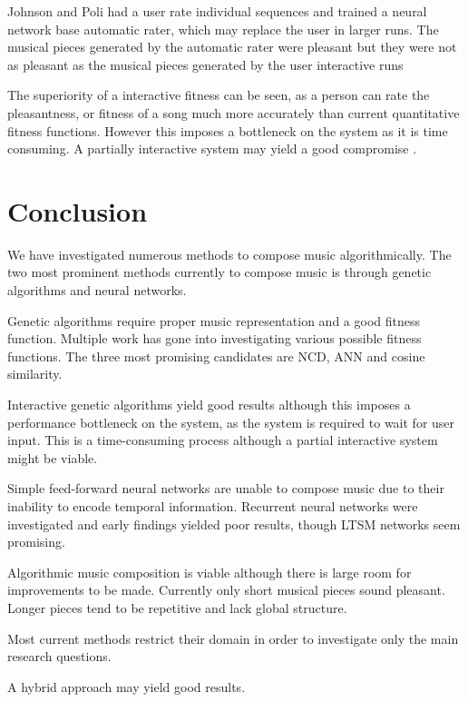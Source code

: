 Johnson and Poli had a user rate individual sequences and trained a neural network base automatic rater, which may replace the user in larger runs. The musical pieces generated by the automatic rater were pleasant but they were not as pleasant as the musical pieces generated by the user interactive runs \cite{Johanson1998}

The superiority of a interactive fitness can be seen, as a person can rate the pleasantness, or fitness of a song much more accurately than current quantitative fitness functions. However this imposes a bottleneck on the system as it is time consuming. A partially interactive system may yield a good compromise \cite{Biles1996}.


\chapter{Conclusion}
We have investigated numerous methods to compose music algorithmically. The two most prominent methods currently to compose music is through genetic algorithms and neural networks.

Genetic algorithms require proper music representation and a good fitness function. Multiple work has gone into investigating various possible fitness functions. The three most promising candidates are \ac{NCD}, \ac{ANN} and cosine similarity.

Interactive genetic algorithms yield good results although this imposes a performance bottleneck on the system, as the system is required to wait for user input. This is a time-consuming process although a partial interactive system might be viable.

Simple feed-forward neural networks are unable to compose music due to their inability to encode temporal information. Recurrent neural networks were investigated and early findings yielded poor results, though LTSM networks seem promising.

Algorithmic music composition is viable although there is large room for improvements to be made. Currently only short musical pieces sound pleasant. Longer pieces tend to be repetitive and lack global structure. 

Most current methods restrict their domain in order to investigate only the main research questions. 

A hybrid approach may yield good results. 



